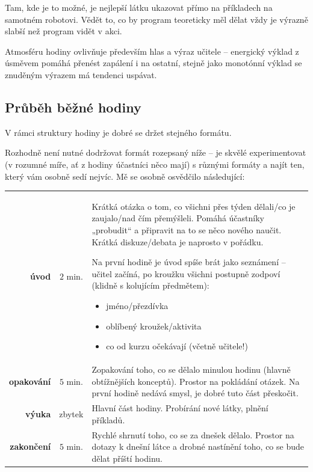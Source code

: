 Tam, kde je to možné, je nejlepší látku ukazovat přímo na příkladech na samotném robotovi. Vědět to, co by program teoreticky měl dělat vždy je výrazně slabší než program vidět v akci.

Atmosféru hodiny ovlivňuje především hlas a výraz učitele -- energický výklad z úsměvem pomáhá přenést zapálení i na ostatní, stejně jako monotónní výklad se znuděným výrazem má tendenci uspávat.

\subsection{Průběh běžné hodiny}
V rámci struktury hodiny je dobré se držet stejného formátu.

Rozhodně není nutné dodržovat formát rozepsaný níže -- je skvělé experimentovat (v rozumné míře, ať z hodiny účastníci něco mají) s různými formáty a najít ten, který vám osobně sedí nejvíc. Mě se osobně osvědčilo následující:

\begin{table}[h!]
	\begin{tabularx}{\textwidth}{rc>{\setlength{\parskip}{0.5\baselineskip}}X} \toprule
		\textbf{úvod} & $2$ min. & Krátká otázka o tom, co všichni přes týden dělali/co je zaujalo/nad čím přemýšleli. Pomáhá účastníky „probudit“ a připravit na to se něco nového naučit. Krátká diskuze/debata je naprosto v pořádku.

		Na první hodině je úvod spíše brát jako seznámení -- učitel začíná, po kroužku všichni postupně zodpoví (klidně s kolujícím předmětem):
		\begin{itemize}[label=\textbullet, leftmargin=20pt,
							after*={\mbox{}\vspace{-\baselineskip}}]
			\item jméno/přezdívka
			\item oblíbený kroužek/aktivita
			\item co od kurzu očekávají (včetně učitele!)
		\end{itemize}
		\\
		\noalign{\vspace{8pt}}
		\textbf{opakování} & $5$ min. & Zopakování toho, co se dělalo minulou hodinu (hlavně obtížnějších konceptů). Prostor na pokládání otázek. Na první hodině nedává smysl, je dobré tuto část přeskočit. \\
		\noalign{\vspace{8pt}}
		\textbf{výuka} & zbytek &  Hlavní část hodiny. Probírání nové látky, plnění příkladů. \\
		\noalign{\vspace{8pt}}
		\textbf{zakončení} & $5$ min. & Rychlé shrnutí toho, co se za dnešek dělalo. Prostor na dotazy k dnešní látce a drobné nastínění toho, co se bude dělat příští hodinu. \\
		\bottomrule
	\end{tabularx}
\end{table}

